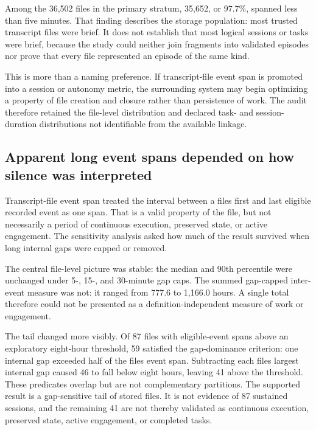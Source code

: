 \documentclass[12pt]{article}
\begin{document}
Among the 36,502 files in the primary stratum, 35,652, or 97.7\%, spanned less than five minutes. That finding describes the storage population: most trusted transcript files were brief. It does not establish that most logical sessions or tasks were brief, because the study could neither join fragments into validated episodes nor prove that every file represented an episode of the same kind.

This is more than a naming preference. If transcript-file event span is promoted into a session or autonomy metric, the surrounding system may begin optimizing a property of file creation and closure rather than persistence of work. The audit therefore retained the file-level distribution and declared task- and session-duration distributions not identifiable from the available linkage.

\subsection{Apparent long event spans depended on how silence was interpreted}\label{apparent-long-event-spans-depended-on-how-silence-was-interpreted}

Transcript-file event span treated the interval between a file\textquotesingle s first and last eligible recorded event as one span. That is a valid property of the file, but not necessarily a period of continuous execution, preserved state, or active engagement. The sensitivity analysis asked how much of the result survived when long internal gaps were capped or removed.

The central file-level picture was stable: the median and 90th percentile were unchanged under 5-, 15-, and 30-minute gap caps. The summed gap-capped inter-event measure was not: it ranged from 777.6 to 1,166.0 hours. A single total therefore could not be presented as a definition-independent measure of work or engagement.

The tail changed more visibly. Of 87 files with eligible-event spans above an exploratory eight-hour threshold, 59 satisfied the gap-dominance criterion: one internal gap exceeded half of the file\textquotesingle s event span. Subtracting each file\textquotesingle s largest internal gap caused 46 to fall below eight hours, leaving 41 above the threshold. These predicates overlap but are not complementary partitions. The supported result is a gap-sensitive tail of stored files. It is not evidence of 87 sustained sessions, and the remaining 41 are not thereby validated as continuous execution, preserved state, active engagement, or completed tasks.
\end{document}
